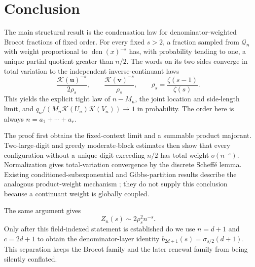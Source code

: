 \section{Conclusion}\label{sec:conclusion}

The main structural result is the condensation law for
denominator-weighted Brocot fractions of fixed order.  For every fixed
\(s>2\), a fraction sampled from \(\mathcal Q_n\) with weight proportional to
\(\operatorname{den}(x)^{-s}\) has, with probability tending to one, a unique
partial quotient greater than \(n/2\).  The words on its two sides converge
in total variation to the independent inverse-continuant laws
\[
 \frac{\mathcal K(\mathbf u)^{-s}}{2\rho_s},
 \qquad
 \frac{\mathcal K(\mathbf v)^{-s}}{\rho_s},
 \qquad \rho_s=\frac{\zeta(s-1)}{\zeta(s)}.
\]
This yields the explicit tight law of \(n-M_n\), the joint location and
side-length limit, and
\(q_n/(M_n\mathcal K(U_n)\mathcal K(V_n))\to1\) in probability.  The order
here is always \(n=a_1+\cdots+a_r\).

The proof first obtains the fixed-context limit and a summable product
majorant.  Two-large-digit and greedy moderate-block estimates then show
that every configuration without a unique digit exceeding \(n/2\) has total
weight \(o(n^{-s})\).  Normalization gives total-variation convergence by
the discrete Scheff\'e lemma.  Existing conditioned-subexponential and
Gibbs-partition results describe the analogous product-weight mechanism
\cite{ArmendarizLoulakis2011,Stufler2020}; they do not supply this conclusion
because a continuant weight is globally coupled.

The same argument gives
\[
 Z_n(s)\sim2\rho_s^2n^{-s}.
\]
Only after this field-indexed statement is established do we use
\(n=d+1\) and \(c=2d+1\) to obtain the denominator-layer identity
\(b_{2d+1}(s)=\sigma_{s/2}(d+1)\).  This separation keeps the Brocot family
and the later renewal family from being silently conflated.

